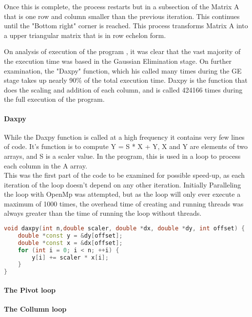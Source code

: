\documentclass[conference]{acmsiggraph}
\begin{document}
Once this is complete, the process restarts but in a subsection of the Matrix A that is one row and column smaller than the previous iteration.
This continues until the "Bottom right" corner is reached. This process transforms Matrix A into a upper triangular matrix that is in row echelon form.

On analysis of execution of the program , it was clear that the vast majority of the execution time was based in the Gaussian Elimination stage.
On further examination, the "Daxpy" function, which his called many times during the GE stage takes up nearly 90\% of the total execution time.
Daxpy is the function that does the scaling and addition of each column, and is called 424166 times during the full execution of the program.

\paragraph{Daxpy}
While the Daxpy function is called at a high frequency it contains very few lines of code.
It's function is to compute Y = S * X + Y, X and Y are elements of two arrays, and S is a scaler value.
In the program, this is used in a loop to process each column in the A array.
\\
This was the first part of the code to be examined for possible speed-up, as each iteration of the loop doesn't depend on any other iteration.
Initially Paralleling the loop with OpenMp was attempted, but as the loop will only ever execute a maximum of 1000 times,
 the overhead time of creating and running threads was always greater than the time of running the loop without threads.


\begin{lstlisting}[language=C++,caption={daxpy Code},label=daxpyCode]
void daxpy(int n,double scaler, double *dx, double *dy, int offset) {
	double *const y = &dy[offset];
	double *const x = &dx[offset];
	for (int i = 0; i < n; ++i) {
		y[i] += scaler * x[i];
	}
}
\end{lstlisting}

\paragraph{The Pivot loop}



\paragraph{The Collumn loop}
\end{document}
